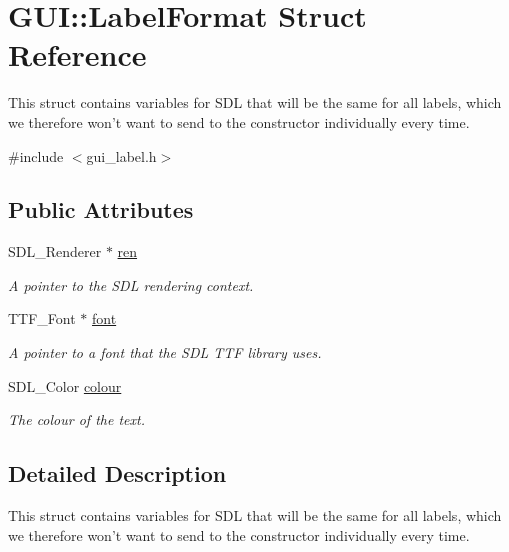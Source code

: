 \hypertarget{structGUI_1_1LabelFormat}{\section{G\-U\-I\-:\-:Label\-Format Struct Reference}
\label{structGUI_1_1LabelFormat}
}


This struct contains variables for S\-D\-L that will be the same for all labels, which we therefore won't want to send to the constructor individually every time.  




{\ttfamily \#include $<$gui\-\_\-label.\-h$>$}

\subsection*{Public Attributes}
\begin{DoxyCompactItemize}
\item 
S\-D\-L\-\_\-\-Renderer $\ast$ \hyperlink{structGUI_1_1LabelFormat_a5523dc0539e9a1150a7f7cc06139305e}{ren}
\begin{DoxyCompactList}\small\item\em A pointer to the S\-D\-L rendering context. \end{DoxyCompactList}\item 
T\-T\-F\-\_\-\-Font $\ast$ \hyperlink{structGUI_1_1LabelFormat_ad2fb1c8fd378426a975b37c553ae1236}{font}
\begin{DoxyCompactList}\small\item\em A pointer to a font that the S\-D\-L T\-T\-F library uses. \end{DoxyCompactList}\item 
S\-D\-L\-\_\-\-Color \hyperlink{structGUI_1_1LabelFormat_a9fc3a6fd4190d525537805c5fb46d8c8}{colour}
\begin{DoxyCompactList}\small\item\em The colour of the text. \end{DoxyCompactList}\end{DoxyCompactItemize}


\subsection{Detailed Description}
This struct contains variables for S\-D\-L that will be the same for all labels, which we therefore won't want to send to the constructor individually every time. 

